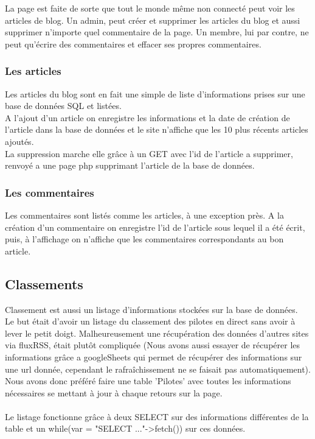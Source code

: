 \documentclass{article}
\begin{document}
La page est faite de sorte que tout le monde même non connecté peut voir les articles de blog. Un admin, peut créer et supprimer les articles du blog et aussi supprimer n'importe quel commentaire de la page. Un membre, lui par contre, ne peut qu'écrire des commentaires et effacer ses propres commentaires.

\subsubsection{Les articles}
Les articles du blog sont en fait une simple de liste d'informations prises sur une base de données SQL et listées.\\
A l'ajout d'un article on enregistre les informations et la date de création de l'article dans la base de données et le site n'affiche que les 10 plus récents articles ajoutés.\\
La suppression marche elle grâce à un GET avec l'id de l'article a supprimer, renvoyé a une page php supprimant l'article de la base de données.

\subsubsection{Les commentaires}
Les commentaires sont listés comme les articles, à une exception près. A la création d'un commentaire on enregistre l'id de l'article sous lequel il a été écrit, puis, à l'affichage on n'affiche que les commentaires correspondants au bon article. 

\subsection{Classements}
Classement est aussi un listage d'informations stockées sur la base de données.\\
Le but était d'avoir un listage du classement des pilotes en direct sans avoir à lever le petit doigt. Malheureusement une récupération des données d'autres sites via fluxRSS, était plutôt compliquée (Nous avons aussi essayer de récupérer les informations grâce a googleSheets qui permet de récupérer des informations sur une url donnée, cependant le rafraîchissement ne se faisait pas automatiquement).\\
Nous avons donc préféré faire une table 'Pilotes' avec toutes les informations nécessaires se mettant à jour à chaque retours sur la page.\\\\
Le listage fonctionne grâce à deux SELECT sur des informations différentes de la table et un while(var = "SELECT ..."->fetch()) sur ces données.
\end{document}

